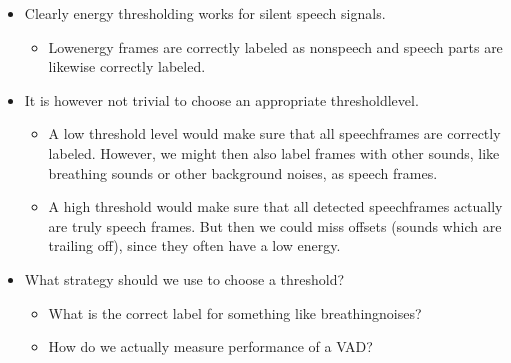 \documentclass[letterpaper,10pt,english]{jupyterBook}
\begin{document}
\sphinxAtStartPar
{}
\begin{itemize}
\item {} 
\sphinxAtStartPar
Clearly energy thresholding works for silent speech signals.
\begin{itemize}
\item {} 
\sphinxAtStartPar
Low\sphinxhyphen{}energy frames are correctly labeled as non\sphinxhyphen{}speech and speech
parts are likewise correctly labeled.

\end{itemize}

\item {} 
\sphinxAtStartPar
It is however not trivial to choose an appropriate threshold\sphinxhyphen{}level.
\begin{itemize}
\item {} 
\sphinxAtStartPar
A low threshold level would make sure that all speech\sphinxhyphen{}frames are
correctly labeled. However, we might then also label frames with
other sounds, like breathing sounds or other background noises,
as speech frames.

\item {} 
\sphinxAtStartPar
A high threshold would make sure that all detected speech\sphinxhyphen{}frames
actually are truly speech frames. But then we could miss offsets
(sounds which are trailing off), since they often have a low
energy.

\end{itemize}

\item {} 
\sphinxAtStartPar
What strategy should we use to choose a threshold?
\begin{itemize}
\item {} 
\sphinxAtStartPar
What is the correct label for something like breathing\sphinxhyphen{}noises?

\item {} 
\sphinxAtStartPar
How do we actually measure performance of a VAD?

\end{itemize}

\end{itemize}
\end{document}
